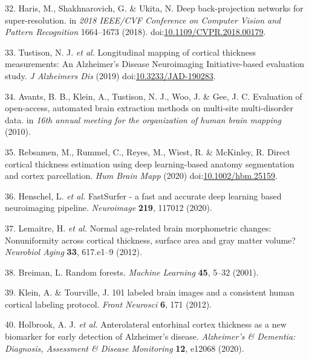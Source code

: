 \documentclass[12pt,]{article}
\begin{document}
\leavevmode\hypertarget{ref-Haris:2018aa}{}%
32. Haris, M., Shakhnarovich, G. \& Ukita, N. Deep back-projection
networks for super-resolution. in \emph{2018 IEEE/CVF Conference on
Computer Vision and Pattern Recognition} 1664--1673 (2018).
doi:\href{https://doi.org/10.1109/CVPR.2018.00179}{10.1109/CVPR.2018.00179}.

\leavevmode\hypertarget{ref-Tustison:2019aa}{}%
33. Tustison, N. J. \emph{et al.} Longitudinal mapping of cortical
thickness measurements: An Alzheimer's Disease Neuroimaging
Initiative-based evaluation study. \emph{J Alzheimers Dis} (2019)
doi:\href{https://doi.org/10.3233/JAD-190283}{10.3233/JAD-190283}.

\leavevmode\hypertarget{ref-Avants:2010ab}{}%
34. Avants, B. B., Klein, A., Tustison, N. J., Woo, J. \& Gee, J. C.
Evaluation of open-access, automated brain extraction methods on
multi-site multi-disorder data. in \emph{16th annual meeting for the
organization of human brain mapping} (2010).

\leavevmode\hypertarget{ref-Rebsamen:2020aa}{}%
35. Rebsamen, M., Rummel, C., Reyes, M., Wiest, R. \& McKinley, R.
Direct cortical thickness estimation using deep learning-based anatomy
segmentation and cortex parcellation. \emph{Hum Brain Mapp} (2020)
doi:\href{https://doi.org/10.1002/hbm.25159}{10.1002/hbm.25159}.

\leavevmode\hypertarget{ref-Henschel:2020aa}{}%
36. Henschel, L. \emph{et al.} FastSurfer - a fast and accurate deep
learning based neuroimaging pipeline. \emph{Neuroimage} \textbf{219},
117012 (2020).

\leavevmode\hypertarget{ref-Lemaitre:2012aa}{}%
37. Lemaitre, H. \emph{et al.} Normal age-related brain morphometric
changes: Nonuniformity across cortical thickness, surface area and gray
matter volume? \emph{Neurobiol Aging} \textbf{33}, 617.e1--9 (2012).

\leavevmode\hypertarget{ref-Breiman:2001aa}{}%
38. Breiman, L. Random forests. \emph{Machine Learning} \textbf{45},
5--32 (2001).

\leavevmode\hypertarget{ref-Klein:2012aa}{}%
39. Klein, A. \& Tourville, J. 101 labeled brain images and a consistent
human cortical labeling protocol. \emph{Front Neurosci} \textbf{6}, 171
(2012).

\leavevmode\hypertarget{ref-holbrook2020anterolateral}{}%
40. Holbrook, A. J. \emph{et al.} Anterolateral entorhinal cortex
thickness as a new biomarker for early detection of Alzheimer's disease.
\emph{Alzheimer's \& Dementia: Diagnosis, Assessment \& Disease
Monitoring} \textbf{12}, e12068 (2020).
\end{document}
